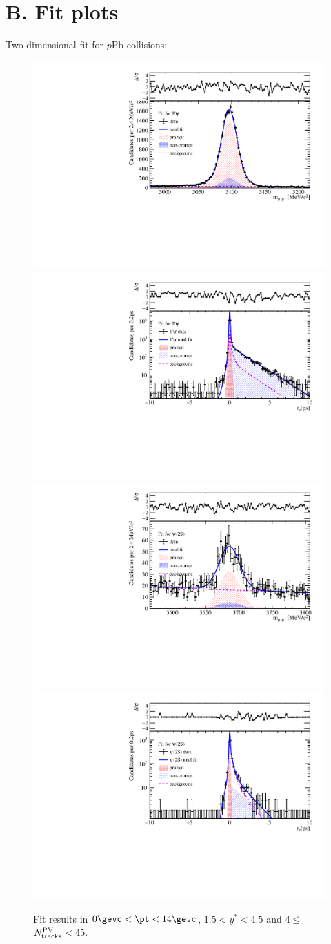 \clearpage
\section*{B. Fit plots}
Two-dimensional fit for $p$Pb collisions:
\label{Fit plots}
\begin{figure}[H]
\begin{center}
\includegraphics[width=0.45\linewidth]{pdf/pPb/Workdir/TwoDimFit/ProjMass/Jpsi_n1y1pt1.pdf}
\includegraphics[width=0.45\linewidth]{pdf/pPb/Workdir/TwoDimFit/ProjTz/Jpsi_n1y1pt1.pdf}
\vspace*{-0.5cm}
\includegraphics[width=0.45\linewidth]{pdf/pPb/Workdir/TwoDimFit/ProjMass/Psi2S_n1y1pt1.pdf}
\includegraphics[width=0.45\linewidth]{pdf/pPb/Workdir/TwoDimFit/ProjTz/Psi2S_n1y1pt1.pdf}
\vspace*{-0.5cm}
\end{center}
\caption{Fit results in $0\gevc<\pt<14\gevc$, $1.5<y^*<4.5$ and 4$\leq$$N_{\rm tracks}^{\rm PV}$$<$45.}
\end{figure}

